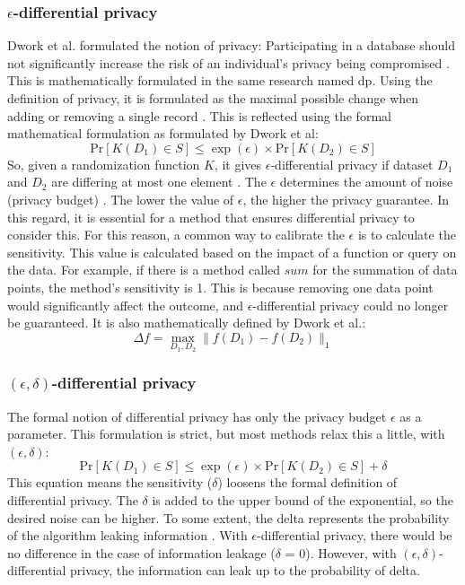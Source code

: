\subsubsection{$\epsilon$-differential privacy}
Dwork et al. formulated the notion of privacy: Participating in a database should not significantly increase the risk of an individual's privacy being compromised \cite{dwork_differential_2006}.
This is mathematically formulated in the same research named \gls{dp}.
Using the definition of privacy, it is formulated as the maximal possible change when adding or removing a single record \citep{dwork_differential_2006, friedman_data_2010}.
This is reflected using the formal mathematical formulation as formulated by Dwork et al:
\begin{equation}
  {\mathrm{Pr}}[K(D_{1})\in S]\leq\exp(\epsilon)\times{\mathrm{Pr}}[K(D_{2})\in S]
  \label{pure-dp}
\end{equation}
So, given a randomization function $K$, it gives $\epsilon$-differential privacy if dataset $D_1$ and $D_2$ are differing at most one element \citep{dwork_differential_2006}.
The $\epsilon$ determines the amount of noise (privacy budget) \citep{friedman_data_2010}.
The lower the value of $\epsilon$, the higher the privacy guarantee.
In this regard, it is essential for a method that ensures differential privacy to consider this.
For this reason, a common way to calibrate the $\epsilon$ is to calculate the sensitivity.
This value is calculated based on the impact of a function or query on the data.
For example, if there is a method called $sum$ for the summation of data points, the method's sensitivity is 1.
This is because removing one data point would significantly affect the outcome, and $\epsilon$-differential privacy could no longer be guaranteed.
It is also mathematically defined by Dwork et al.:
\begin{equation}
  \Delta f=\operatorname*{max}_{D_{1},D_{2}}\|f(D_{1})-f(D_{2})\|_{1}
  \label{sensitivity-dp}
\end{equation}
\subsubsection{$(\epsilon, \delta)$-differential privacy}
The formal notion of differential privacy has only the privacy budget $\epsilon$ as a parameter.
This formulation is strict, but most methods relax this a little, with $(\epsilon, \delta)$:
\begin{equation}
  {\mathrm{Pr}}[K(D_{1})\in S]\leq\exp(\epsilon)\times{\mathrm{Pr}}[K(D_{2})\in S] + \delta
  \label{approxiate-dp}
\end{equation}
This equation means the sensitivity ($\delta$) loosens the formal definition of differential privacy.
The $\delta$ is added to the upper bound of the exponential, so the desired noise can be higher.
To some extent, the delta represents the probability of the algorithm leaking information \citep{aitsam_differential_2021}.
With $\epsilon$-differential privacy, there would be no difference in the case of information leakage ($\delta$ = 0).
However, with $(\epsilon, \delta)$-differential privacy, the information can leak up to the probability of delta.
\newpage
